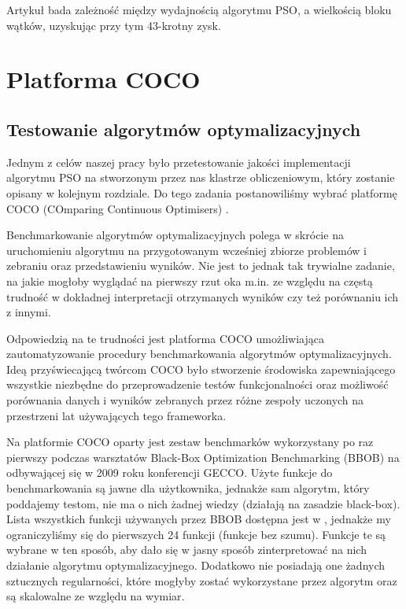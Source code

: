 \documentclass[12pt, twoside, openany, abstract=on]{report}
\theoremstyle{definition}
\begin{document}
Artykuł \cite{BlockOccupancyGpu} bada zależność między wydajnością algorytmu PSO, a wielkością bloku wątków, uzyskując przy tym 43-krotny zysk.

\chapter{Platforma COCO}
\section{Testowanie algorytmów optymalizacyjnych}

Jednym z celów naszej pracy było przetestowanie jakości implementacji algorytmu PSO na stworzonym przez nas klastrze obliczeniowym, który zostanie opisany w kolejnym rozdziale. Do tego zadania postanowiliśmy wybrać platformę COCO (COmparing Continuous Optimisers) \cite{Coco}.

Benchmarkowanie algorytmów optymalizacyjnych polega w skrócie na uruchomieniu algorytmu na przygotowanym wcześniej zbiorze problemów i zebraniu oraz przedstawieniu wyników. Nie jest to jednak tak trywialne zadanie, na jakie mogłoby wyglądać na pierwszy rzut oka m.in. ze względu na częstą trudność w dokładnej interpretacji otrzymanych wyników czy też porównaniu ich z innymi.

Odpowiedzią na te trudności jest platforma COCO umożliwiająca zautomatyzowanie procedury benchmarkowania algorytmów optymalizacyjnych. Ideą przyświecającą twórcom COCO było stworzenie środowiska zapewniającego wszystkie niezbędne do przeprowadzenie testów funkcjonalności oraz możliwość porównania danych i wyników zebranych przez różne zespoły uczonych na przestrzeni lat używających tego frameworka. 


Na platformie COCO oparty jest zestaw benchmarków wykorzystany po raz pierwszy podczas warsztatów Black-Box Optimization Benchmarking (BBOB) na odbywającej się w 2009 roku konferencji GECCO.
Użyte funkcje do benchmarkowania są jawne dla użytkownika, jednakże sam algorytm, który poddajemy testom, nie ma o nich żadnej wiedzy (działają na zasadzie black-box). Lista wszystkich funkcji używanych przez BBOB dostępna jest w \cite{Coco}, jednakże my ograniczyliśmy się do pierwszych 24 funkcji (funkcje bez szumu).
Funkcje te są wybrane w ten sposób, aby dało się w jasny sposób zinterpretować na nich działanie algorytmu optymalizacyjnego. Dodatkowo nie posiadają one żadnych sztucznych regularności, które mogłyby zostać wykorzystane przez algorytm oraz są skalowalne ze względu na wymiar.
\end{document}
